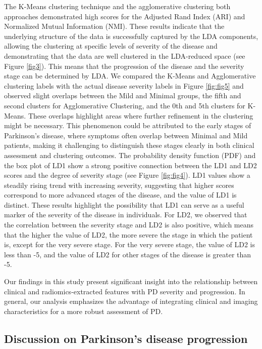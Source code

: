 \documentclass{article}
\begin{document}
The K-Means clustering technique and the agglomerative clustering both approaches demonstrated high scores for the Adjusted Rand Index (ARI) and Normalized Mutual Information (NMI). These results indicate that the underlying structure of the data is successfully captured by the LDA components, allowing the clustering at specific levels of severity of the disease and demonstrating that the data are well clustered in the LDA-reduced space (see Figure \ref{fig3}). This means that the progression of the disease and the severity stage can be determined by LDA. We compared the K-Means and Agglomerative clustering labels with the actual disease severity labels in Figure \ref{fig:fig5} and observed slight overlaps between the Mild and Minimal groups, the fifth and second clusters for Agglomerative Clustering, and the 0th and 5th clusters for K-Means. These overlaps highlight areas where further refinement in the clustering might be necessary. This phenomenon could be attributed to the early stages of Parkinson's disease, where symptoms often overlap between Minimal and Mild patients, making it challenging to distinguish these stages clearly in both clinical assessment and clustering outcomes. The probability density function (PDF) and the box plot of LD1 show a strong positive connection between the LD1 and LD2 scores and the degree of severity stage (see Figure \ref{fig:fig4}). LD1 values show a steadily rising trend with increasing severity, suggesting that higher scores correspond to more advanced stages of the disease, and the value of LD1 is distinct. These results highlight the possibility that LD1 can serve as a useful marker of the severity of the disease in individuals. For LD2, we observed that the correlation between the severity stage and LD2 is also positive, which means that the higher the value of LD2, the more severe the stage in which the patient is, except for the very severe stage. For the very severe stage, the value of LD2 is less than -5, and the value of LD2 for other stages of the disease is greater than -5.

Our findings in this study present significant insight into the relationship between clinical and radiomics-extracted features with PD severity and progression. In general, our analysis emphasizes the advantage of integrating clinical and imaging characteristics for a more robust assessment of PD.


\subsection{Discussion on Parkinson’s disease progression}
\end{document}
